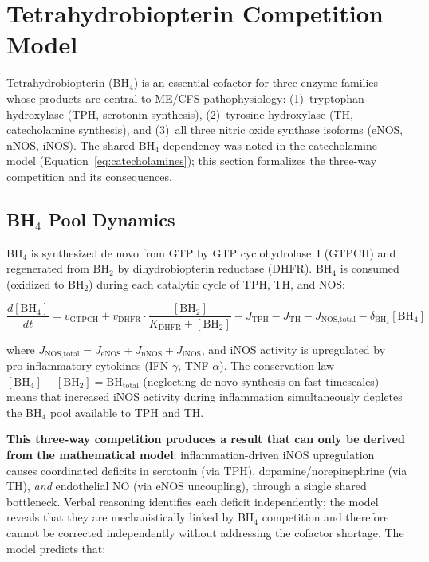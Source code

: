 \section{Tetrahydrobiopterin Competition Model}
\label{sec:bh4-competition}

Tetrahydrobiopterin (BH$_4$) is an essential cofactor for three enzyme families whose products are central to ME/CFS pathophysiology: (1)~tryptophan hydroxylase (TPH, serotonin synthesis), (2)~tyrosine hydroxylase (TH, catecholamine synthesis), and (3)~all three nitric oxide synthase isoforms (eNOS, nNOS, iNOS). The shared BH$_4$ dependency was noted in the catecholamine model (Equation~\ref{eq:catecholamines}); this section formalizes the three-way competition and its consequences.

\subsection{BH$_4$ Pool Dynamics}

BH$_4$ is synthesized de novo from GTP by GTP cyclohydrolase~I (GTPCH) and regenerated from BH$_2$ by dihydrobiopterin reductase (DHFR). BH$_4$ is consumed (oxidized to BH$_2$) during each catalytic cycle of TPH, TH, and NOS:

\begin{equation}
\label{eq:bh4-dynamics}
\frac{d[\text{BH}_4]}{dt} = v_{\text{GTPCH}} + v_{\text{DHFR}} \cdot \frac{[\text{BH}_2]}{K_{\text{DHFR}} + [\text{BH}_2]} - J_{\text{TPH}} - J_{\text{TH}} - J_{\text{NOS,total}} - \delta_{\text{BH}_4} [\text{BH}_4]
\end{equation}

where $J_{\text{NOS,total}} = J_{\text{eNOS}} + J_{\text{nNOS}} + J_{\text{iNOS}}$, and iNOS activity is upregulated by pro-inflammatory cytokines (IFN-$\gamma$, TNF-$\alpha$). The conservation law $[\text{BH}_4] + [\text{BH}_2] = \text{BH}_{\text{total}}$ (neglecting de novo synthesis on fast timescales) means that increased iNOS activity during inflammation simultaneously depletes the BH$_4$ pool available to TPH and TH.

\textbf{This three-way competition produces a result that can only be derived from the mathematical model}: inflammation-driven iNOS upregulation causes coordinated deficits in serotonin (via TPH), dopamine/norepinephrine (via TH), \emph{and} endothelial NO (via eNOS uncoupling), through a single shared bottleneck. Verbal reasoning identifies each deficit independently; the model reveals that they are mechanistically linked by BH$_4$ competition and therefore cannot be corrected independently without addressing the cofactor shortage. The model predicts that:

